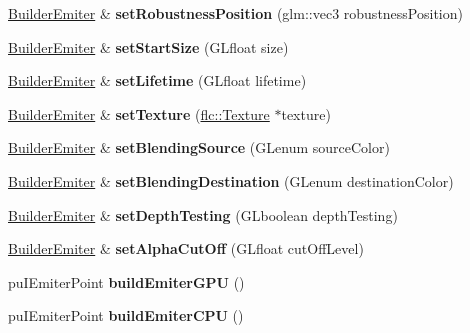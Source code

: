 \begin{DoxyCompactItemize}
\item 
\mbox{\label{classflw_1_1flf_1_1BuilderEmiter_a175528b261603f4c068742a466c683d6}} 
\hyperlink{classflw_1_1flf_1_1BuilderEmiter}{Builder\+Emiter} \& {\bfseries set\+Robustness\+Position} (glm\+::vec3 robustness\+Position)
\item 
\mbox{\label{classflw_1_1flf_1_1BuilderEmiter_aa15293c9c54677d2d8681b0554054c5f}} 
\hyperlink{classflw_1_1flf_1_1BuilderEmiter}{Builder\+Emiter} \& {\bfseries set\+Start\+Size} (G\+Lfloat size)
\item 
\mbox{\label{classflw_1_1flf_1_1BuilderEmiter_ab6a83e1908dff2d44383a623150e05fd}} 
\hyperlink{classflw_1_1flf_1_1BuilderEmiter}{Builder\+Emiter} \& {\bfseries set\+Lifetime} (G\+Lfloat lifetime)
\item 
\mbox{\label{classflw_1_1flf_1_1BuilderEmiter_a475b844ff412679844ad119fa2089fbf}} 
\hyperlink{classflw_1_1flf_1_1BuilderEmiter}{Builder\+Emiter} \& {\bfseries set\+Texture} (\hyperlink{classflw_1_1flc_1_1Texture}{flc\+::\+Texture} $\ast$texture)
\item 
\mbox{\label{classflw_1_1flf_1_1BuilderEmiter_a27f8b3e2804ff47162fe2731cc167bf0}} 
\hyperlink{classflw_1_1flf_1_1BuilderEmiter}{Builder\+Emiter} \& {\bfseries set\+Blending\+Source} (G\+Lenum source\+Color)
\item 
\mbox{\label{classflw_1_1flf_1_1BuilderEmiter_a14e4f56ea5d30c1495bf0affa80ed4d6}} 
\hyperlink{classflw_1_1flf_1_1BuilderEmiter}{Builder\+Emiter} \& {\bfseries set\+Blending\+Destination} (G\+Lenum destination\+Color)
\item 
\mbox{\label{classflw_1_1flf_1_1BuilderEmiter_a03b51afcbae7f0a4506273d3e02d8dfd}} 
\hyperlink{classflw_1_1flf_1_1BuilderEmiter}{Builder\+Emiter} \& {\bfseries set\+Depth\+Testing} (G\+Lboolean depth\+Testing)
\item 
\mbox{\label{classflw_1_1flf_1_1BuilderEmiter_ae5272c6a780830b691fda1a58e387ee1}} 
\hyperlink{classflw_1_1flf_1_1BuilderEmiter}{Builder\+Emiter} \& {\bfseries set\+Alpha\+Cut\+Off} (G\+Lfloat cut\+Off\+Level)
\item 
\mbox{\label{classflw_1_1flf_1_1BuilderEmiter_aadeaaee36e99644da1df706fee362219}} 
pu\+I\+Emiter\+Point {\bfseries build\+Emiter\+G\+PU} ()
\item 
\mbox{\label{classflw_1_1flf_1_1BuilderEmiter_ab42b38f7eb290dac2b6282b191dec767}} 
pu\+I\+Emiter\+Point {\bfseries build\+Emiter\+C\+PU} ()
\end{DoxyCompactItemize}


